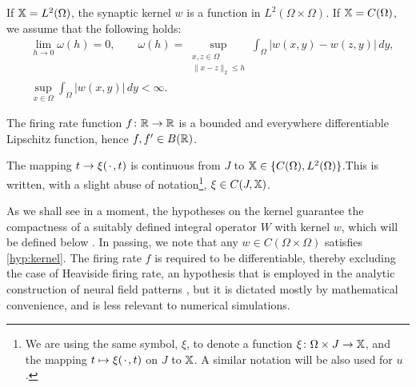 \documentclass[a4paper,baskervaldx]{daarticle}
\begin{document}
\begin{hypothesis}\label{hyp:kernel}
  If $\mathbb{X} = L^2(\Omega)$, the synaptic kernel $w$ is a function in $L^2(\Omega
  \times \Omega)$. If $\mathbb{X} = C(\Omega)$, we assume that the following holds: 
  \begin{align}
    & \lim_{h \to 0} \omega(h) = 0,  \qquad \omega(h) = \sup_{\substack{x,z \in \Omega\\ \| x- z \|_2 \leq h}} \int_\Omega
    |w(x,y) - w(z,y)|\, dy, \\
    & \sup_{x \in \Omega} \int_\Omega |w(x,y)| \, dy < \infty.
  \end{align}
\end{hypothesis}
%

\begin{hypothesis}\label{hyp:firingRate}
  The firing rate function $f \colon \mathbb{R} \to \mathbb{R}$ is a bounded and everywhere
  differentiable Lipschitz function, hence $f,f' \in B(\mathbb{R})$.
\end{hypothesis}

\begin{hypothesis}\label{hyp:externalInput} The mapping $t \to
  \xi({\mkern 2mu\cdot\mkern 2mu},t)$ is continuous from $J$ to $\mathbb{X} \in \{C(\Omega),L^2(\Omega)\} $.This is written,
  with a slight abuse of notation\footnote{We are using the same symbol, $\xi$, to
  denote a function $\xi \colon \Omega \times J \to \mathbb{X}$, and the mapping $t \mapsto
\xi({\mkern 2mu\cdot\mkern 2mu},t)$ on $J$ to $\mathbb{X}$. A similar notation will be also used for $u$.}, $\xi \in C(J,\mathbb{X})$.
\end{hypothesis}

As we shall see in a moment, the hypotheses on the kernel guarantee the compactness
of a suitably defined integral operator $W$ with kernel $w$, which will be defined below \cite[Section
2.8.1]{atkinson2005theoretical}. In passing, we note that any $w \in C(\Omega \times
\Omega)$ satisfies \cref{hyp:kernel}. The firing rate $f$ is required to be
differentiable, thereby excluding the case of Heaviside firing rate, an hypothesis
that is employed in the analytic construction of neural field patterns
\cite[Chapters 1, 3]{amari1977dynamics,coombes2014neural}, but it is
dictated mostly by mathematical convenience, and is less relevant to numerical
simulations.
\end{document}
